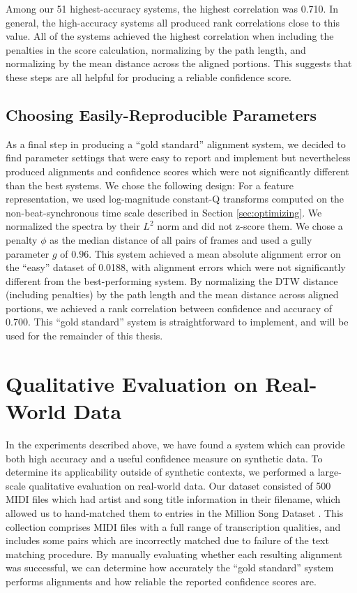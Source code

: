 Among our 51 highest-accuracy systems, the highest correlation was 0.710.
In general, the high-accuracy systems all produced rank correlations close to this value.
All of the systems achieved the highest correlation when including the penalties in the score calculation, normalizing by the path length, and normalizing by the mean distance across the aligned portions.
This suggests that these steps are all helpful for producing a reliable confidence score.


\subsection{Choosing Easily-Reproducible Parameters}

As a final step in producing a ``gold standard'' alignment system, we decided to find parameter settings that were easy to report and implement but nevertheless produced alignments and confidence scores which were not significantly different than the best systems.
We chose the following design: For a feature representation, we used log-magnitude constant-Q transforms computed on the non-beat-synchronous time scale described in Section \ref{sec:optimizing}.
We normalized the spectra by their $L^2$ norm and did not z-score them.
We chose a penalty $\phi$ as the median distance of all pairs of frames and used a gully parameter $g$ of $0.96$.
This system achieved a mean absolute alignment error on the ``easy'' dataset of 0.0188, with alignment errors which were not significantly different from the best-performing system.
By normalizing the DTW distance (including penalties) by the path length and the mean distance across aligned portions, we achieved a rank correlation between confidence and accuracy of 0.700.
This ``gold standard'' system is straightforward to implement, and will be used for the remainder of this thesis.

\section{Qualitative Evaluation on Real-World Data}
\label{sec:qualitative}

In the experiments described above, we have found a system which can provide both high accuracy and a useful confidence measure on synthetic data.
To determine its applicability outside of synthetic contexts, we performed a large-scale qualitative evaluation on real-world data.
Our dataset consisted of 500 MIDI files which had artist and song title information in their filename, which allowed us to hand-matched them to entries in the Million Song Dataset \cite{bertin2011million}.
This collection comprises MIDI files with a full range of transcription qualities, and includes some pairs which are incorrectly matched due to failure of the text matching procedure.
By manually evaluating whether each resulting alignment was successful, we can determine how accurately the ``gold standard'' system performs alignments and how reliable the reported confidence scores are.

